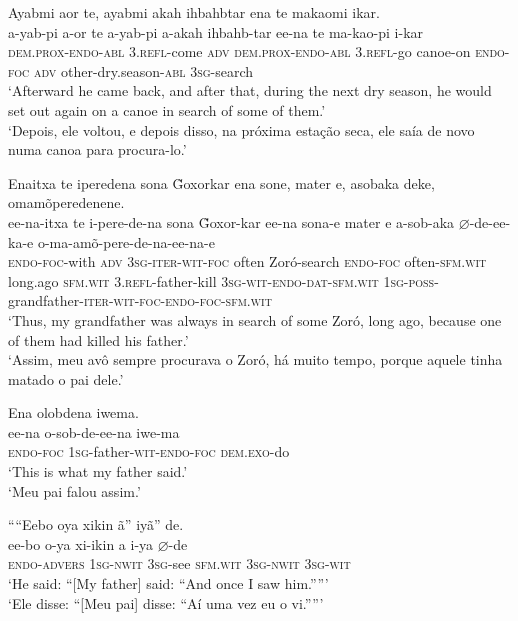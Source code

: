\documentclass[output=paper,
modfonts,nonflat
]{langsci/langscibook}
\begin{document}
\ea Ayabmi aor te, ayabmi akah ihbahbtar ena te makaomi ikar.\\[.3em]
\gll a-yab-pi a-or te{\footnotemark} a-yab-pi a-akah ihbahb-tar ee-na te ma-kao-pi i-kar\\
 \textsc{dem.prox-endo-abl} \textsc{3.refl}-come \textsc{adv} \textsc{dem.prox-endo-abl} \textsc{3.refl}-go canoe-on \textsc{endo-foc} \textsc{adv} other-dry.season-\textsc{abl} \textsc{3sg}-search\\
\glt ‘Afterward he came back, and after that, during the next dry season, he would set out again on a canoe in search of some of them.’\\
\glt ‘Depois, ele voltou, e depois disso, na próxima estação seca, ele saía de novo numa canoa para procura-lo.’\\
\z
 
\ea Enaitxa te iperedena sona \~{G}oxorkar ena sone, mater e, asobaka deke, omamõperedenene.\\[.3em]
\gll ee-na-itxa te i-pere-de-na sona \~{G}oxor-kar ee-na sona-e mater e a-sob-aka \(\varnothing\)-de-ee-ka-e o-ma-amõ-pere-de-na-ee-na-e\\
\textsc{endo-foc}-with \textsc{adv} \textsc{3sg-iter-wit-foc} often Zoró-search \textsc{endo-foc} often-\textsc{sfm.wit} long.ago \textsc{sfm.wit} \textsc{3.refl}-father-kill \textsc{3sg-wit-endo-dat-sfm.wit} \textsc{1sg-poss}-grandfather-\textsc{iter-wit-foc-endo-foc-sfm.wit}\\
\glt ‘Thus, my grandfather was always in search of some Zoró, long ago, because one of them had killed his father.’\\
\glt ‘Assim, meu avô sempre procurava o Zoró, há muito tempo, porque aquele tinha matado o pai dele.’\\
\z

\largerpage
\ea Ena olobdena iwema.\\[.3em]
\gll ee-na o-sob-de-ee-na iwe-ma\\
\textsc{endo-foc} \textsc{1sg}-father-\textsc{wit-endo-foc} \textsc{dem.exo}-do\\
\glt ‘This is what my father said.’\\
\glt ‘Meu pai falou assim.’\\
\z

\ea ““Eebo oya xikin ã” iyã” de.\\[.3em]
\gll ee-bo o-ya xi-ikin a i-ya \(\varnothing\)-de\\
\textsc{endo-advers} \textsc{1sg-nwit} \textsc{3sg}-see \textsc{sfm.wit} \textsc{3sg-nwit} \textsc{3sg-wit}\\
\glt ‘He said: “[My father] said: “And once I saw him.””’ \\
\glt ‘Ele disse: “[Meu pai] disse: “Aí uma vez eu o vi.””’ \\
\z
\end{document}
